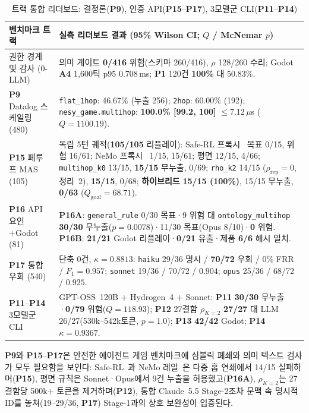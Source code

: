 \begin{table}[!tbp]
\caption{트랙 통합 리더보드: 결정론(\textbf{P9}), 인증 API(\textbf{P15}--\textbf{P17}), 3모델군 CLI(\textbf{P11}--\textbf{P14})}
\label{tab:phase4-compact}
\centering
\scriptsize
\setlength{\tabcolsep}{2.5pt}
\begin{tabularx}{\columnwidth}{@{}>{\raggedright\arraybackslash}p{}>{\raggedright\arraybackslash}X@{}}
\toprule
\textbf{벤치마크 트랙} & \textbf{실측 리더보드 결과 (95\% Wilson CI; $Q$ / McNemar $p$)} \\
\midrule
권한 경계 및 감사 (0-LLM) & 의미 게이트 \textbf{0/416} 위험(스키마 260/416), $\rho$ 128/260 수리; Godot \textbf{A4} 1,600틱 p95 0.708\,ms; \textbf{P1} 120건 \textbf{100\%} 대 50.83\%. \\
\textbf{P9} Datalog 스케일링 (480) & \texttt{flat\_1hop}: 46.67\% (누출 256); \texttt{2hop}: 60.00\% (192); \texttt{nesy\_game.multihop}: \textbf{100.0\% [99.2, 100]} $\le$7.12\,$\mu$s ($Q{=}1100.19$). \\
\textbf{P15} 폐루프 MAS (105) & 독립 5턴 궤적(\textbf{105/105} 리플레이): Safe-RL 프록시~\cite{alshiekh2018shield} 목표 0/15, 위험 16/61; NeMo 프록시~\cite{rebedea2023nemo} 1/15, 15/61; 평면 12/15, 4/66; \texttt{multihop\_k0} 13/15, \textbf{15/15} 무누출, 0/69; \texttt{rho\_k2} 14/15 ($\rho_{\mathrm{rep}}{=}0$, 정리~2), \textbf{15/15}, 0/68; \textbf{하이브리드} \textbf{15/15 (100\%)}, 15/15 무누출, \textbf{0/63} ($Q_{\mathrm{goal}}{=}68.71$). \\
\textbf{P16} API 요인+Godot (81) & \textbf{P16A}: \texttt{general\_rule} 0/30 목표·9 위험 대 \texttt{ontology\_multihop} \textbf{30/30} 무누출($p{=}0.0078$)·11/30 목표(Opus 8/10)·\textbf{0} 위험. \textbf{P16B}: \textbf{21/21} Godot 리플레이·\textbf{0/21} 유출·제품 \textbf{6/6} 해시 일치. \\
\textbf{P17} 통합 우회 (540) & 단축 0건, $\kappa{=}\mathbf{0.8813}$: \texttt{haiku} 29/36 명시 / \textbf{70/72} 우회 / 0\% FRR / $F_1{=}\mathbf{0.957}$; \texttt{sonnet} 19/36 / 70/72 / $0.904$; \texttt{opus} 25/36 / 68/72 / $0.925$. \\
\textbf{P11}--\textbf{P14} 3모델군 CLI & GPT-OSS~120B + Hydrogen~4 + Sonnet: \textbf{P11} \textbf{30/30} 무누출·\textbf{0/79} 위험($Q{=}118.93$); \textbf{P12} 27결함 $\rho_{K=2}$ \textbf{27/27} 대 LLM 26/27(530k--542k토큰, $p{=}1.0$); \textbf{P13} \textbf{42/42} Godot; \textbf{P14} $\kappa{=}\mathbf{0.9367}$. \\
\bottomrule
\end{tabularx}
\end{table}

\textbf{P9}와 \textbf{P15}--\textbf{P17}은 안전한 에이전트 게임 벤치마크에 심볼릭 폐쇄와 의미 텍스트 검사가 모두 필요함을 보인다: Safe-RL~\cite{alshiekh2018shield}과 NeMo 레일~\cite{rebedea2023nemo}은 다중 홉 연쇄에서 14/15 실패하며(\textbf{P15}), 평면 규칙은 Sonnet·Opus에서 9건 누출을 허용했고(\textbf{P16A}), $\rho_{K=2}$는 27결함당 500k+ 토큰을 제거하며(\textbf{P12}), 통합 Claude~5.5 Stage-2조차 문맥 속 명시적 ID를 놓쳐(19--29/36, \textbf{P17}) Stage-1과의 상호 보완성이 입증된다.
